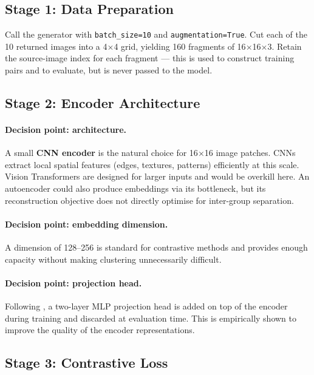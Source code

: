 \documentclass[12pt, a4paper]{article}
\begin{document}
\subsection{Stage 1: Data Preparation}

Call the generator with \texttt{batch\_size=10} and \texttt{augmentation=True}. Cut each
of the 10 returned images into a 4$\times$4 grid, yielding 160 fragments of
16$\times$16$\times$3. Retain the source-image index for each fragment — this is used to
construct training pairs and to evaluate, but is never passed to the model.

\subsection{Stage 2: Encoder Architecture}

\paragraph{Decision point: architecture.}
A small \textbf{CNN encoder} is the natural choice for 16$\times$16 image patches.
CNNs extract local spatial features (edges, textures, patterns) efficiently at this
scale. Vision Transformers are designed for larger inputs and would be overkill here.
An autoencoder could also produce embeddings via its bottleneck, but its reconstruction
objective does not directly optimise for inter-group separation.

\paragraph{Decision point: embedding dimension.}
A dimension of 128--256 is standard for contrastive methods and provides enough capacity
without making clustering unnecessarily difficult.

\paragraph{Decision point: projection head.}
Following \textcite{simclr2020}, a two-layer MLP projection head is added on top of the
encoder during training and discarded at evaluation time. This is empirically shown to
improve the quality of the encoder representations.

\subsection{Stage 3: Contrastive Loss}
\end{document}
